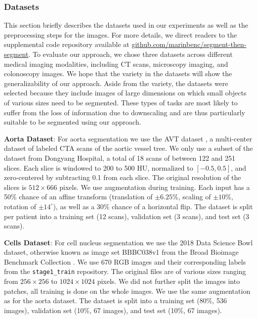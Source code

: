\subsubsection{Datasets}\label{datasets}

This section briefly describes the datasets used in our experiments as well as the preprocessing steps for the images. For more details, we direct readers to the supplemental code repository available at \href{https://github.com/marinbenc/segment-then-segment}{github.com/marinbenc/segment-then-segment}. To evaluate our approach, we chose three datasets across different medical imaging modalities, including CT scans, microscopy imaging, and colonoscopy images. We hope that the variety in the datasets will show the generalizability of our approach. Aside from the variety, the datasets were selected because they include images of large dimensions on which small objects of various sizes need to be segmented. These types of tasks are most likely to suffer from the loss of information due to downscaling and are thus particularly suitable to be segmented using our approach.

\textbf{Aorta Dataset}: For aorta segmentation we use the AVT dataset \cite{radlAVTMulticenterAortic2022}, a multi-center dataset of labeled CTA scans of the aortic vessel tree. We only use a subset of the dataset from Dongyang Hospital, a total of 18 scans of between 122 and 251 slices. Each slice is windowed to 200 to 500 HU, normalized to $[-0.5, 0.5]$, and zero-centered by subtracting 0.1 from each slice. The original resolution of the slices is $512 \times 666$ pixels. We use augmentation during training. Each input has a 50\% chance of an affine transform (translation of $\pm6.25\%$, scaling of $\pm10\%$, rotation of $\pm14^{\circ}$), as well as a 30\% chance of a horizontal flip. The dataset is split per patient into a training set (12 scans), validation set (3 scans), and test set (3 scans).

\textbf{Cells Dataset}: For cell nucleus segmentation we use the 2018 Data Science Bowl dataset, otherwise known as image set BBBC038v1 from the Broad Bioimage Benchmark Collection \cite{caicedoNucleusSegmentationImaging2019}. We use 670 RGB images and their corresponding labels from the \verb|stage1_train| repository. The original files are of various sizes ranging from $256 \times 256$ to $1024 \times 1024$ pixels. We did not further split the images into patches, all training is done on the whole images. We use the same augmentation as for the aorta dataset. The dataset is split into a training set (80\%, 536 images), validation set (10\%, 67 images), and test set (10\%, 67 images).

